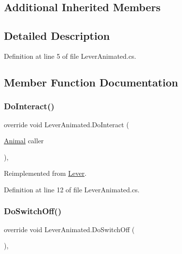 \subsection*{Additional Inherited Members}


\subsection{Detailed Description}


Definition at line 5 of file Lever\+Animated.\+cs.



\subsection{Member Function Documentation}
\mbox{\label{class_lever_animated_a63d3742fe2e3b7597c7eecbc57ae7a0e}} 
\subsubsection{\texorpdfstring{Do\+Interact()}{DoInteract()}}
{\footnotesize\ttfamily override void Lever\+Animated.\+Do\+Interact (\begin{DoxyParamCaption}\item[{\mbox{\hyperlink{class_animal}{Animal}}}]{caller }\end{DoxyParamCaption})\hspace{0.3cm}{\ttfamily [protected]}, {\ttfamily [virtual]}}



Reimplemented from \mbox{\hyperlink{class_lever_a0a1c141e11547a71e93492bebbd045d7}{Lever}}.



Definition at line 12 of file Lever\+Animated.\+cs.

\mbox{\label{class_lever_animated_a2b56274f9c38469d1bb76321b87dc397}} 
\subsubsection{\texorpdfstring{Do\+Switch\+Off()}{DoSwitchOff()}}
{\footnotesize\ttfamily override void Lever\+Animated.\+Do\+Switch\+Off (\begin{DoxyParamCaption}{ }\end{DoxyParamCaption})\hspace{0.3cm}{\ttfamily [protected]}, {\ttfamily [virtual]}}



